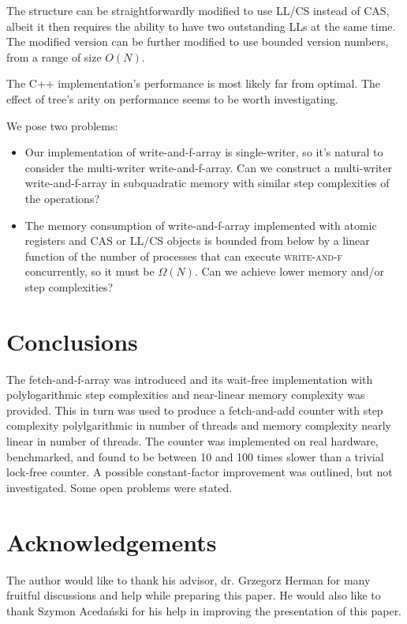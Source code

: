 \documentclass[a4paper,11pt]{article}
\newcommand{\fn}[1]{\textsc{#1}}
\begin{document}
The structure can be straightforwardly modified to use LL/CS instead of CAS, albeit it then requires the ability to have two outstanding LLs at the same time. The modified version can be further modified to use
bounded version numbers, from a range of size $O(N)$.

The C++ implementation's performance is most likely far from optimal. The effect of tree's arity on performance
seems to be worth investigating.

We pose two problems:

\begin{itemize}
	\item Our implementation of write-and-f-array is single-writer, so it's natural to consider the multi-writer write-and-f-array. Can we construct a multi-writer write-and-f-array in subquadratic memory with similar step complexities of the operations?

	\item The memory consumption of write-and-f-array implemented with atomic registers and CAS or LL/CS objects is bounded from below by a linear function of the number of processes that can execute \fn{write-and-f} concurrently\cite{lowerbound}, so it must be $\Omega(N)$. Can we achieve lower memory and/or step complexities?
\end{itemize}

\section{Conclusions}
The fetch-and-f-array was introduced and its wait-free implementation with polylogarithmic step complexities
and near-linear memory complexity was provided. This in turn was used to produce a fetch-and-add counter
with step complexity polylgarithmic in number of threads and memory complexity nearly linear in number
of threads. The counter was implemented on real hardware, benchmarked, and found to be between 10 and 100
times slower than a trivial lock-free counter. A possible constant-factor improvement was outlined, but
not investigated. Some open problems were stated.

\section{Acknowledgements}
The author would like to thank his advisor, dr. Grzegorz Herman for many fruitful discussions and help while preparing this paper. He would also like to thank Szymon Acedański for his help in improving the presentation of this paper.
\end{document}
